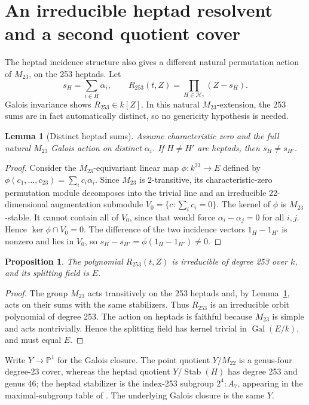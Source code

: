 \documentclass[11pt,letterpaper]{article}
\newtheorem{proposition}[theorem]{Proposition}
\newtheorem{lemma}[theorem]{Lemma}
\theoremstyle{definition}
\newcommand{\PP}{\mathbb{P}}
\newcommand{\Gal}{\operatorname{Gal}}
\newcommand{\Stab}{\operatorname{Stab}}
\newcommand{\oct}{\mathcal{H}_7}
\begin{document}
\section{An irreducible heptad resolvent and a second quotient cover}
The heptad incidence structure also gives a different natural permutation action of \(M_{23}\), on the 253 heptads. Let
\[
s_H=\sum_{i\in H}\alpha_i,\qquad
R_{253}(t,Z)=\prod_{H\in\oct}(Z-s_H).
\]
Galois invariance shows \(R_{253}\in k[Z]\). In this natural \(M_{23}\)-extension, the 253 sums are in fact automatically distinct, so no genericity hypothesis is needed.

\begin{lemma}[Distinct heptad sums]\label{lem:sums}
Assume characteristic zero and the full natural \(M_{23}\) Galois action on distinct \(\alpha_i\). If \(H\ne H'\) are heptads, then \(s_H\ne s_{H'}\).
\end{lemma}
\begin{proof}
Consider the \(M_{23}\)-equivariant linear map \(\phi:k^{23}\to E\) defined by \(\phi(c_1,\ldots,c_{23})=\sum_i c_i\alpha_i\). Since \(M_{23}\) is 2-transitive, its characteristic-zero permutation module decomposes into the trivial line and an irreducible 22-dimensional augmentation submodule \(V_0=\{c:\sum_i c_i=0\}\). The kernel of \(\phi\) is \(M_{23}\)-stable. It cannot contain all of \(V_0\), since that would force \(\alpha_i-\alpha_j=0\) for all \(i,j\). Hence \(\ker\phi\cap V_0=0\). The difference of the two incidence vectors \(1_H-1_{H'}\) is nonzero and lies in \(V_0\), so \(s_H-s_{H'}=\phi(1_H-1_{H'})\ne0\).
\end{proof}

\begin{proposition}\label{prop:res}
The polynomial \(R_{253}(t,Z)\) is irreducible of degree 253 over \(k\), and its splitting field is \(E\).
\end{proposition}
\begin{proof}
The group \(M_{23}\) acts transitively on the 253 heptads and, by Lemma~\ref{lem:sums}, acts on their sums with the same stabilizers. Thus \(R_{253}\) is an irreducible orbit polynomial of degree 253. The action on heptads is faithful because \(M_{23}\) is simple and acts nontrivially. Hence the splitting field has kernel trivial in \(\Gal(E/k)\), and must equal \(E\).
\end{proof}

Write \(Y\to\PP^1\) for the Galois closure. The point quotient \(Y/M_{22}\) is a genus-four degree-23 cover, whereas the heptad quotient \(Y/\Stab(H)\) has degree 253 and genus 46; the heptad stabilizer is the index-253 subgroup \(2^4\!:\!A_7\), appearing in the maximal-subgroup table of \cite[Table 2]{HJLPPZ26}. The underlying Galois closure is the same \(Y\).
\end{document}
